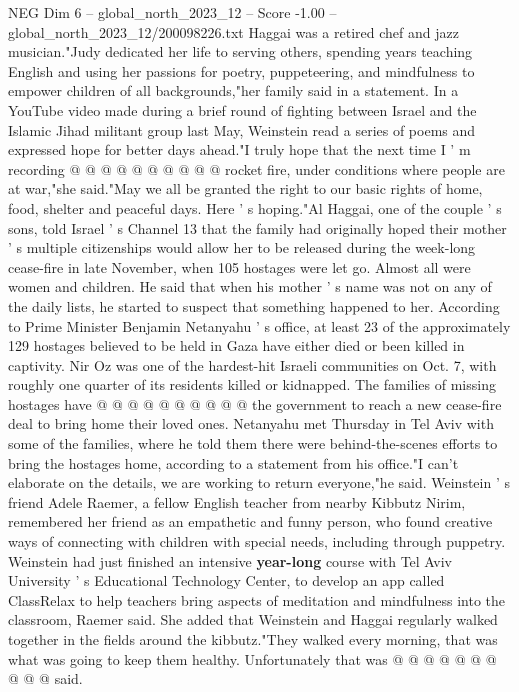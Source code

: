 \begin{textsample}{NEG Dim 6 – global\_north\_2023\_12 – Score -1.00 – global\_north\_2023\_12/200098226.txt}
Haggai was a retired chef and jazz musician."Judy dedicated her life to serving others, spending years teaching English and using her passions for poetry, puppeteering, and mindfulness to empower children of all backgrounds,"her family said in a statement.
In a YouTube video made during a brief round of fighting between Israel and the Islamic Jihad militant group last May, Weinstein read a series of poems and expressed hope for better days ahead."I truly hope that the next time I ' m recording @ @ @ @ @ @ @ @ @ @ rocket fire, under conditions where people are at war,"she said."May we all be granted the right to our basic rights of home, food, shelter and peaceful days.
Here ' s hoping."Al Haggai, one of the couple ' s sons, told Israel ' s Channel 13 that the family had originally hoped their mother ' s multiple citizenships would allow her to be released during the week-long cease-fire in late November, when 105 hostages were let go.
Almost all were women and children.
He said that when his mother ' s name was not on any of the daily lists, he started to suspect that something happened to her.
According to Prime Minister Benjamin Netanyahu ' s office, at least 23 of the approximately 129 hostages believed to be held in Gaza have either died or been killed in captivity.
Nir Oz was one of the hardest-hit Israeli communities on Oct. 7, with roughly one quarter of its residents killed or kidnapped.
The families of missing hostages have @ @ @ @ @ @ @ @ @ @ the government to reach a new cease-fire deal to bring home their loved ones.
Netanyahu met Thursday in Tel Aviv with some of the families, where he told them there were behind-the-scenes efforts to bring the hostages home, according to a statement from his office."I can't elaborate on the details, we are working to return everyone,"he said.
Weinstein ' s friend Adele Raemer, a fellow English teacher from nearby Kibbutz Nirim, remembered her friend as an empathetic and funny person, who found creative ways of connecting with children with special needs, including through puppetry.
Weinstein had just finished an intensive \textbf{year-long} course with Tel Aviv University ' s Educational Technology Center, to develop an app called ClassRelax to help teachers bring aspects of meditation and mindfulness into the classroom, Raemer said.
She added that Weinstein and Haggai regularly walked together in the fields around the kibbutz."They walked every morning, that was what was going to keep them healthy.
Unfortunately that was @ @ @ @ @ @ @ @ @ @ said.

\end{textsample}
